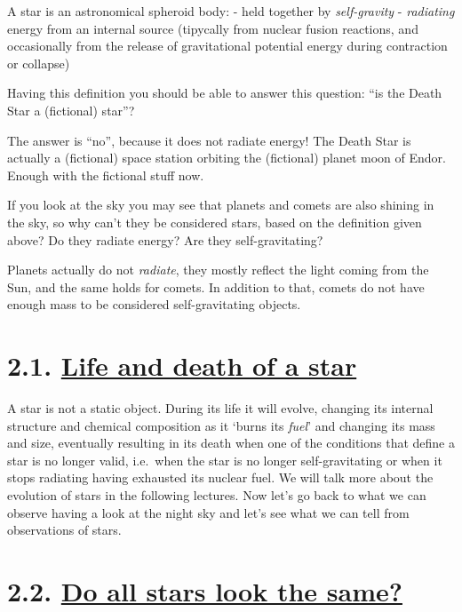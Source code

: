\documentclass[
  letterpaper,
  DIV=11,
  numbers=noendperiod]{scrreprt}
\begin{document}
A star is an astronomical spheroid body: - held together by
\emph{self-gravity} - \emph{radiating} energy from an internal source
(tipycally from nuclear fusion reactions, and occasionally from the
release of gravitational potential energy during contraction or
collapse)

Having this definition you should be able to answer this question: ``is
the Death Star a (fictional) star''?

The answer is ``no'', because it does not radiate energy! The Death Star
is actually a (fictional) space station orbiting the (fictional) planet
moon of Endor. Enough with the fictional stuff now.

If you look at the sky you may see that planets and comets are also
shining in the sky, so why can't they be considered stars, based on the
definition given above? Do they radiate energy? Are they
self-gravitating?

Planets actually do not \emph{radiate}, they mostly reflect the light
coming from the Sun, and the same holds for comets. In addition to that,
comets do not have enough mass to be considered self-gravitating
objects.

\hypertarget{life-and-death-of-a-star}{%
\section{\texorpdfstring{2.1. \protect\hyperlink{toc0_}{Life and death
of a
star}}{2.1. Life and death of a star}}\label{life-and-death-of-a-star}}

A star is not a static object. During its life it will evolve, changing
its internal structure and chemical composition as it `burns its
\emph{fuel}' and changing its mass and size, eventually resulting in its
death when one of the conditions that define a star is no longer valid,
i.e.~when the star is no longer self-gravitating or when it stops
radiating having exhausted its nuclear fuel. We will talk more about the
evolution of stars in the following lectures. Now let's go back to what
we can observe having a look at the night sky and let's see what we can
tell from observations of stars.

\hypertarget{do-all-stars-look-the-same}{%
\section{\texorpdfstring{2.2. \protect\hyperlink{toc0_}{Do all stars
look the
same?}}{2.2. Do all stars look the same?}}\label{do-all-stars-look-the-same}}
\end{document}
